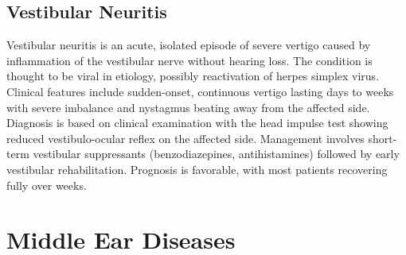 \subsection{Vestibular Neuritis}
\label{sec:Vestibular Neuritis}
Vestibular neuritis is an acute, isolated episode of severe vertigo caused by inflammation of the vestibular nerve without hearing loss. The condition is thought to be viral in etiology, possibly reactivation of herpes simplex virus. Clinical features include sudden-onset, continuous vertigo lasting days to weeks with severe imbalance and nystagmus beating away from the affected side. Diagnosis is based on clinical examination with the head impulse test showing reduced vestibulo-ocular reflex on the affected side. Management involves short-term vestibular suppressants (benzodiazepines, antihistamines) followed by early vestibular rehabilitation. Prognosis is favorable, with most patients recovering fully over weeks.

\section{Middle Ear Diseases}








\label{sec:Middle Ear Diseases}

